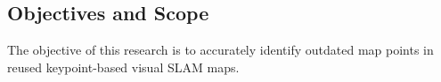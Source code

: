 \subsection{Objectives and Scope}
\label{objectives}

The objective of this research is to accurately identify outdated map points in reused keypoint-based visual SLAM maps. 